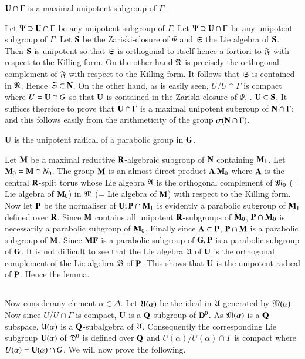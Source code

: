 \begin{lemma}\label{art9-lem4.7}
$\mathbf{U} \cap \Gamma$ is a maximal unipotent subgroup of $\Gamma$.
\end{lemma}

Let $\Psi \supset \mathbf{U} \cap \Gamma$ be any unipotent subgroup of $\Gamma$. Let $\Psi \supset \mathbf{U} \cap \Gamma$ be any unipotent subgroup of $\Gamma$. Let $\mathbf{S}$ be the Zariski-closure of $\Psi$ and $\mathfrak{S}$ the Lie algebra of $\mathbf{S}$. Then $\mathbf{S}$ is unipotent so that $\mathfrak{S}$ is orthogonal to itself hence a fortiori to $\mathfrak{F}$ with respect to the Killing form. On the other hand $\mathfrak{N}$ is precisely the orthogonal complement of $\mathfrak{F}$ with respect to the Killing form. It follows that $\mathfrak{S}$ is contained in $\mathfrak{N}$. Hence $\mathfrak{S} \subset \mathbf{N}$. On the other hand, as is easily seen, $U/U \cap \Gamma$ is compact where $U = \mathbf{U} \cap G$ so that $\mathbf{U}$ is contained in the Zariski-closure of $\Psi$, \ie. $\mathbf{U} \subset \mathbf{S}$. It suffices therefore to prove that $\mathbf{U} \cap \Gamma$ is a maximal unipotent subgroup of $\mathbf{N} \cap \Gamma$; and this follows easily from the arithmeticity of the group $\sigma (\mathbf{N} \cap \Gamma)$.

\begin{lemma}\label{art9-lem4.8}
$\mathbf{U}$ is the unipotent radical of a parabolic group in $\mathbf{G}$.
\end{lemma}

Let $\mathbf{M}$ be a maximal reductive $\mathbf{R}$-algebraic subgroup of $\mathbf{N}$ containing $\mathbf{M}_1$. Let $\mathbf{M}_0 = \mathbf{M} \cap N_0$. The group $\mathbf{M}$ is an almost direct product $\mathbf{A}. \mathbf{M}_0$ where $\mathbf{A}$ is the central $\mathbf{R}$-split torus whose Lie algebra $\mathfrak{A}$ is the orthogonal complement of $\mathfrak{M}_0$ (= Lie algebra of $\mathbf{M}_0$) in $\mathfrak{M}$ (= Lie algebra of $\mathbf{M}$) with respect to the Killing form. Now let $\mathbf{P}$ be the normaliser of $\mathbf{U}; \mathbf{P} \cap \mathbf{M}_1$ is evidently a parabolic subgroup of $\mathbf{M}_1$ defined over $\mathbf{R}$. Since $\mathbf{M}$ contains all unipotent $\mathbf{R}$-subgroups of $\mathbf{M}_0$, $\mathbf{P} \cap \mathbf{M}_0$ is  necessarily a parabolic subgroup of $\mathbf{M}_0$. Finally since $\mathbf{A} \subset \mathbf{P}$, $\mathbf{P} \cap \mathbf{M}$ is a parabolic subgroup of $\mathbf{M}$. Since $\mathbf{M} \mathbf{F}$ is a parabolic subgroup of $\mathbf{G}, \mathbf{P}$ is a parabolic subgroup of $\mathbf{G}$. It is not difficult to see that the Lie algebra $\mathfrak{U}$ of $\mathbf{U}$ is the orthogonal complement of the Lie algebra $\mathfrak{B}$ of $\mathbf{P}$. This shows that $\mathbf{U}$ is the unipotent radical of $\mathbf{P}$. Hence the lemma.

\subsection{}\label{art9-subsec4.9}
Now consider\pageoriginale any element $\alpha \in \Delta$. Let $\mathfrak{U} (\alpha)$ be the ideal in $\mathfrak{U}$ generated by $\mathfrak{M} (\alpha)$. Now since $U / U \cap \Gamma$ is compact, $\mathbf{U}$ is a $\mathbf{Q}$-subgroup of $\mathbf{D}^0$. As $\mathfrak{M}(\alpha)$ is a $\mathbf{Q}$-subspace, $\mathfrak{U} (\alpha)$ is a $\mathbf{Q}$-subalgebra of $\mathfrak{U}$. Consequently the corresponding Lie subgroup $\mathbf{U} (\alpha)$ of $\mathfrak{D}^0$ is defined  over $\mathbf{Q}$ and $U (\alpha) / U (\alpha) \cap \Gamma$ is compact where $U (\alpha) = \mathbf{U} (\alpha) \cap G$. We will now prove the following.

